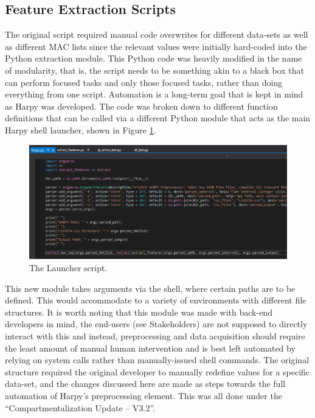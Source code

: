 \documentclass{article}
\begin{document}
\subsection{Feature Extraction Scripts}
The original script required manual code overwrites for different
data-sets as well as different MAC lists since the relevant values were
initially hard-coded into the Python extraction module. This Python code
was heavily modified in the name of modularity, that is, the script
needs to be something akin to a black box that can perform focused tasks and
only those focused tasks, rather than doing everything from one script.
Automation is a long-term goal that is kept in mind as Harpy was
developed. The code was broken down to different function definitions that can
be called via a different Python module that acts as the main Harpy
shell launcher, shown in Figure \ref{fig:launcher}.

\begin{figure}[!ht]
\begin{center}
\includegraphics[scale=0.5]{InputSystem/Launcher.png}
\end{center}
\caption {The Launcher script.}
\label{fig:launcher}
\end{figure}
\pagebreak


This new module takes arguments via the shell, where certain paths are
to be defined. This would accommodate to a variety of environments with
different file structures. It is worth noting that this module was made
with back-end developers in mind, the end-users (see Stakeholders) are
not supposed to directly interact with this and instead, preprocessing
and data acquisition should require the least amount of manual human
intervention and is best left automated by relying on system calls
rather than manually-issued shell commands. The original structure
required the original developer to manually redefine values for a
specific data-set, and the changes discussed here are made as steps
towards the full automation of Harpy's preprocessing element. This was
all done under the ``Compartmentalization Update -- V3.2''.\newline
\end{document}
